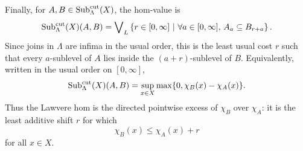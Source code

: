 \begin{example}
    Finally, for \(A,B\in\mathrm{Sub}^{\mathrm{cut}}_\Lambda(X)\), the hom-value is
    \[
        \mathrm{Sub}^{\mathrm{cut}}_\Lambda(X)(A,B)
        =
        \bigvee\nolimits_L
        \left\{
            r\in[0,\infty]
            \ \middle|\
            \forall a\in[0,\infty],\,
            A_a\subseteq B_{r+a}
        \right\}.
    \]
    Since joins in \(\Lambda\) are infima in the usual order, this is the least usual cost \(r\) such that every \(a\)-sublevel of \(A\) lies inside the \((a+r)\)-sublevel of \(B\). Equivalently, written in the usual order on \([0,\infty]\),
    \[
        \mathrm{Sub}^{\mathrm{cut}}_\Lambda(X)(A,B)
        =
        \sup_{x\in X}
        \max\{0,\chi_B(x)-\chi_A(x)\}.
    \]
    Thus the Lawvere hom is the directed pointwise excess of \(\chi_B\) over \(\chi_A\): it is the least additive shift \(r\) for which
    \[
        \chi_B(x)\leq \chi_A(x)+r
    \]
    for all \(x\in X\).
\end{example}